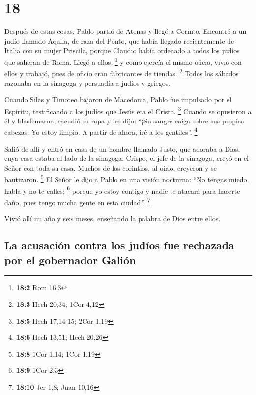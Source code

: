 \hypertarget{section-17}{%
\section{18}\label{section-17}}

 Después de estas cosas, Pablo partió de Atenas y llegó a
Corinto.  Encontró a un judío llamado Aquila, de raza del
Ponto, que había llegado recientemente de Italia con su mujer Priscila,
porque Claudio había ordenado a todos los judíos que salieran de Roma.
Llegó a ellos, \footnote{\textbf{18:2} Rom 16,3}  y como
ejercía el mismo oficio, vivió con ellos y trabajó, pues de oficio eran
fabricantes de tiendas. \footnote{\textbf{18:3} Hech 20,34; 1Cor 4,12}
 Todos los sábados razonaba en la sinagoga y persuadía a
judíos y griegos.

 Cuando Silas y Timoteo bajaron de Macedonia, Pablo fue
impulsado por el Espíritu, testificando a los judíos que Jesús era el
Cristo. \footnote{\textbf{18:5} Hech 17,14-15; 2Cor 1,19} 
Cuando se opusieron a él y blasfemaron, sacudió su ropa y les dijo:
``¡Su sangre caiga sobre sus propias cabezas! Yo estoy limpio. A partir
de ahora, iré a los gentiles''. \footnote{\textbf{18:6} Hech 13,51; Hech
  20,26}

 Salió de allí y entró en casa de un hombre llamado Justo,
que adoraba a Dios, cuya casa estaba al lado de la sinagoga.
 Crispo, el jefe de la sinagoga, creyó en el Señor con
toda su casa. Muchos de los corintios, al oírlo, creyeron y se
bautizaron. \footnote{\textbf{18:8} 1Cor 1,14; 1Cor 1,19} 
El Señor le dijo a Pablo en una visión nocturna: ``No tengas miedo,
habla y no te calles; \footnote{\textbf{18:9} 1Cor 2,3} 
porque yo estoy contigo y nadie te atacará para hacerte daño, pues tengo
mucha gente en esta ciudad.'' \footnote{\textbf{18:10} Jer 1,8; Juan
  10,16}

 Vivió allí un año y seis meses, enseñando la palabra de
Dios entre ellos.

\hypertarget{la-acusaciuxf3n-contra-los-juduxedos-fue-rechazada-por-el-gobernador-galiuxf3n}{%
\subsection{La acusación contra los judíos fue rechazada por el
gobernador
Galión}\label{la-acusaciuxf3n-contra-los-juduxedos-fue-rechazada-por-el-gobernador-galiuxf3n}}


